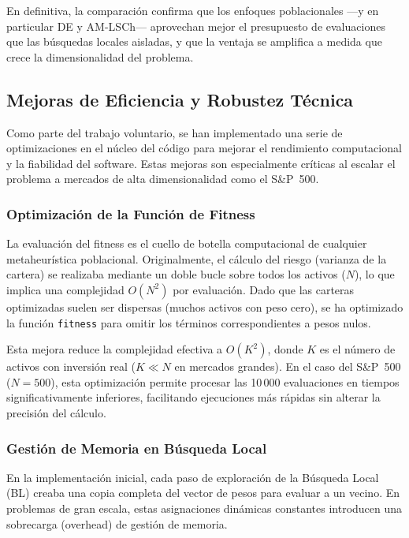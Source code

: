 En definitiva, la comparación confirma que los enfoques poblacionales ---y en particular DE y AM-LSCh--- aprovechan mejor el presupuesto de evaluaciones que las búsquedas locales aisladas, y que la ventaja se amplifica a medida que crece la dimensionalidad del problema.

\subsection{Mejoras de Eficiencia y Robustez Técnica}

Como parte del trabajo voluntario, se han implementado una serie de optimizaciones en el núcleo del código para mejorar el rendimiento computacional y la fiabilidad del software. Estas mejoras son especialmente críticas al escalar el problema a mercados de alta dimensionalidad como el S\&P~500.

\subsubsection{Optimización de la Función de Fitness}

La evaluación del fitness es el cuello de botella computacional de cualquier metaheurística poblacional. Originalmente, el cálculo del riesgo (varianza de la cartera) se realizaba mediante un doble bucle sobre todos los activos ($N$), lo que implica una complejidad $O(N^2)$ por evaluación. Dado que las carteras optimizadas suelen ser dispersas (muchos activos con peso cero), se ha optimizado la función \texttt{fitness} para omitir los términos correspondientes a pesos nulos. 

Esta mejora reduce la complejidad efectiva a $O(K^2)$, donde $K$ es el número de activos con inversión real ($K \ll N$ en mercados grandes). En el caso del S\&P~500 ($N=500$), esta optimización permite procesar las 10\,000 evaluaciones en tiempos significativamente inferiores, facilitando ejecuciones más rápidas sin alterar la precisión del cálculo.

\subsubsection{Gestión de Memoria en Búsqueda Local}

En la implementación inicial, cada paso de exploración de la Búsqueda Local (BL) creaba una copia completa del vector de pesos para evaluar a un vecino. En problemas de gran escala, estas asignaciones dinámicas constantes introducen una sobrecarga (overhead) de gestión de memoria. 

